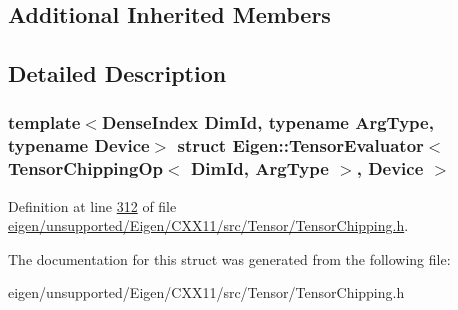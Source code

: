 \subsection*{Additional Inherited Members}


\subsection{Detailed Description}
\subsubsection*{template$<$Dense\+Index Dim\+Id, typename Arg\+Type, typename Device$>$\newline
struct Eigen\+::\+Tensor\+Evaluator$<$ Tensor\+Chipping\+Op$<$ Dim\+Id, Arg\+Type $>$, Device $>$}



Definition at line \hyperlink{eigen_2unsupported_2_eigen_2_c_x_x11_2src_2_tensor_2_tensor_chipping_8h_source_l00312}{312} of file \hyperlink{eigen_2unsupported_2_eigen_2_c_x_x11_2src_2_tensor_2_tensor_chipping_8h_source}{eigen/unsupported/\+Eigen/\+C\+X\+X11/src/\+Tensor/\+Tensor\+Chipping.\+h}.



The documentation for this struct was generated from the following file\+:\begin{DoxyCompactItemize}
\item 
eigen/unsupported/\+Eigen/\+C\+X\+X11/src/\+Tensor/\+Tensor\+Chipping.\+h\end{DoxyCompactItemize}

